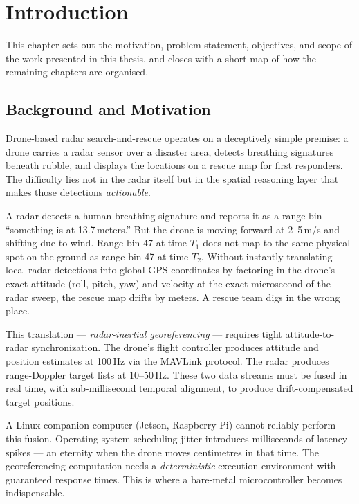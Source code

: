 \chapter{Introduction}
\label{ch:intro}

This chapter sets out the motivation, problem statement, objectives, and scope of the work presented in this thesis, and closes with a short map of how the remaining chapters are organised.

\section{Background and Motivation}

Drone-based radar search-and-rescue operates on a deceptively simple premise: a drone carries a radar sensor over a disaster area, detects breathing signatures beneath rubble, and displays the locations on a rescue map for first responders. The difficulty lies not in the radar itself but in the spatial reasoning layer that makes those detections \emph{actionable}.

A radar detects a human breathing signature and reports it as a range bin --- ``something is at 13.7\,meters.'' But the drone is moving forward at 2--5\,m/s and shifting due to wind. Range bin 47 at time $T_1$ does not map to the same physical spot on the ground as range bin 47 at time $T_2$. Without instantly translating local radar detections into global GPS coordinates by factoring in the drone's exact attitude (roll, pitch, yaw) and velocity at the exact microsecond of the radar sweep, the rescue map drifts by meters. A rescue team digs in the wrong place.

This translation --- \emph{radar-inertial georeferencing} --- requires tight attitude-to-radar synchronization. The drone's flight controller produces attitude and position estimates at 100\,Hz via the MAVLink protocol. The radar produces range-Doppler target lists at 10--50\,Hz. These two data streams must be fused in real time, with sub-millisecond temporal alignment, to produce drift-compensated target positions.

A Linux companion computer (Jetson, Raspberry Pi) cannot reliably perform this fusion. Operating-system scheduling jitter introduces milliseconds of latency spikes --- an eternity when the drone moves centimetres in that time. The georeferencing computation needs a \emph{deterministic} execution environment with guaranteed response times. This is where a bare-metal microcontroller becomes indispensable.

